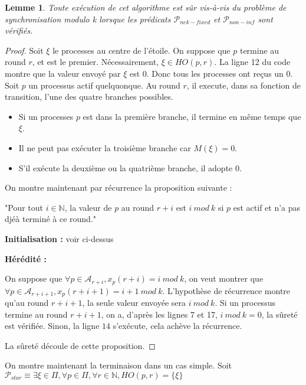 \documentclass{article}
\newtheorem{lemma}{Lemme}
\begin{document}
\begin{lemma}
	Toute exécution de cet algorithme est sûr vis-à-vis du problème de synchronisation modulo k lorsque les prédicats $\mathcal{P}_{nek-fixed}$ et $\mathcal{P}_{non-inf}$ sont vérifiés.
\end{lemma}
\begin{proof}

	Soit $\xi$ le processes au centre de l'étoile.
	On suppose que $p$ termine au round $r$, et est le premier. Nécessairement, $\xi \in HO(p,r)$.
	La ligne 12 du code montre que la valeur envoyé par $\xi$ est $0$.
	Donc tous les processes ont reçus un $0$. Soit $p$ un processus actif quelquonque. Au round $r$, il execute, dans sa fonction de transition, l'une des quatre branches possibles.
	\begin{itemize}

		\item Si un processes $p$ est dans la première branche, il termine en même temps que $\xi$.
		\item Il ne peut pas exécuter la troisième branche car $M(\xi) = 0$.
		\item S'il exécute la deuxième ou la quatrième branche, il adopte $0$.

	\end{itemize}

	On montre maintenant par récurrence la proposition suivante :

	"Pour tout $i \in \mathds{N}$, la valeur de $p$ au round $r+i$ est $i~mod~k$ si $p$ est actif et n'a pas djéà terminé à ce round."

	\textbf{Initialisation : } voir ci-dessus

	\textbf{Hérédité :}

	On suppose que $\forall p \in \mathcal{A}_{r+i}, x_p(r+i) = i~mod~k$, on veut montrer que $\forall p \in \mathcal{A}_{r+i+1}, x_p(r+i+1) = i+1~mod~k$.
	L'hypothèse de récurrence montre qu'au round $r+i+1$, la seule valeur envoyée sera $i~mod~k$.
	Si un processus termine au round $r+i+1$, on a, d'après les lignes 7 et 17, $i~mod~k = 0$, la sûreté est vérifiée.
	Sinon, la ligne $14$ s'exécute, cela achève la récurrence.

	La sûreté découle de cette proposition.

\end{proof}

On montre maintenant la terminaison dans un cas simple.
Soit $\mathcal{P}_{star} \equiv \exists \xi \in \Pi, \forall p \in \Pi, \forall r \in \mathds{N}, HO(p, r) = \{\xi\}$
\end{document}
